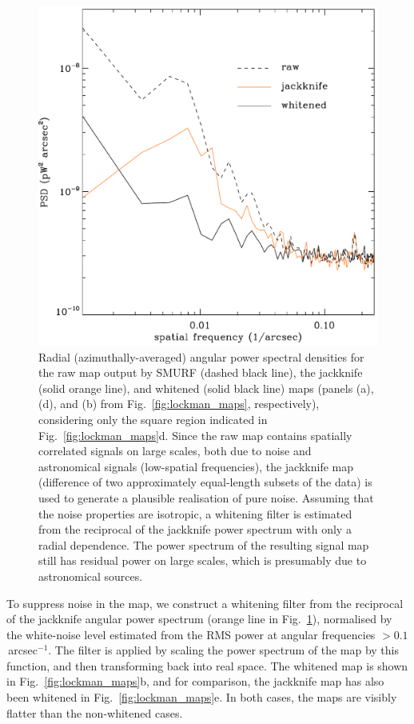 \documentclass[useAMS,usenatbib,nofootinbib]{mn2e}
\begin{document}
\begin{figure}
\centering
\includegraphics[width=\linewidth]{lockman_pspec}
\caption{Radial (azimuthally-averaged) angular power spectral
  densities for the raw map output by SMURF (dashed black line), the
  jackknife (solid orange line), and whitened (solid black line) maps
  (panels (a), (d), and (b) from Fig.~\ref{fig:lockman_maps},
  respectively), considering only the square region indicated in
  Fig.~\ref{fig:lockman_maps}d. Since the raw map contains spatially
  correlated signals on large scales, both due to noise and
  astronomical signals (low-spatial frequencies), the jackknife map
  (difference of two approximately equal-length subsets of the data)
  is used to generate a plausible realisation of pure noise. Assuming
  that the noise properties are isotropic, a whitening filter is
  estimated from the reciprocal of the jackknife power spectrum with
  only a radial dependence. The power spectrum of the resulting signal
  map still has residual power on large scales, which is presumably
  due to astronomical sources.}
\label{fig:lockman_pspec}
\end{figure}

To suppress noise in the map, we construct a whitening filter from the
reciprocal of the jackknife angular power spectrum (orange line in
Fig.~\ref{fig:lockman_pspec}), normalised by the white-noise level
estimated from the RMS power at angular frequencies $>
0.1$\,arcsec$^{-1}$. The filter is applied by scaling the power
spectrum of the map by this function, and then transforming back into
real space. The whitened map is shown in Fig.~\ref{fig:lockman_maps}b,
and for comparison, the jackknife map has also been whitened in
Fig.~\ref{fig:lockman_maps}e. In both cases, the maps are visibly
flatter than the non-whitened cases.
\end{document}
